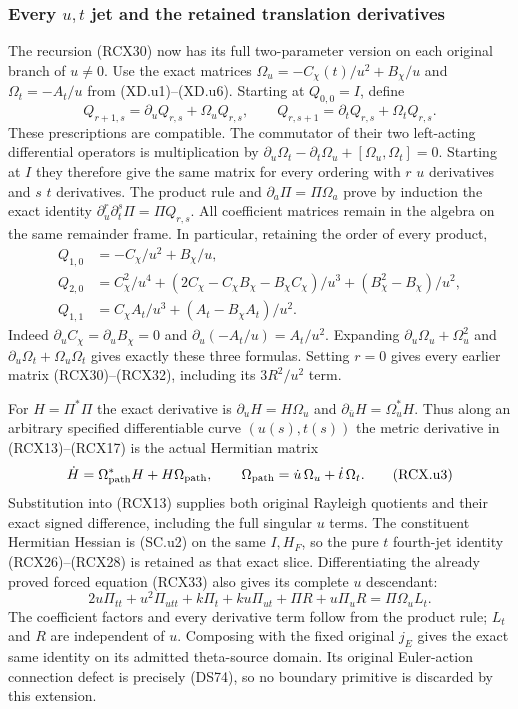 
\subsubsection{Every $u,t$ jet and the retained translation derivatives}
The recursion (RCX30) now has its full two-parameter version on
each original branch of $u\ne0$.  Use the exact matrices
$\Omega_u=-C_\chi(t)/u^2+B_\chi/u$ and
$\Omega_t=-A_t/u$ from (XD.u1)--(XD.u6).  Starting at
$Q_{0,0}=I$, define
\[
 Q_{r+1,s}=\partial_uQ_{r,s}+\Omega_uQ_{r,s},\qquad
 Q_{r,s+1}=\partial_tQ_{r,s}+\Omega_tQ_{r,s}.          \tag{RCX.u1}
\]
These prescriptions are compatible.  The commutator of their
two left-acting differential operators is multiplication by
$\partial_u\Omega_t-\partial_t\Omega_u+
[\Omega_u,\Omega_t]=0$.  Starting at $I$ they therefore give
the same matrix for every ordering with $r$ $u$ derivatives
and $s$ $t$ derivatives.  The product rule and
$\partial_a\Pi=\Pi\Omega_a$ prove by induction the exact
identity
$\partial_u^r\partial_t^s\Pi=\Pi Q_{r,s}$.
All coefficient matrices remain in the algebra on the same
remainder frame.  In particular, retaining the order of
every product,
\[
 \begin{split}
 Q_{1,0}&=-C_\chi/u^2+B_\chi/u,\\
 Q_{2,0}&=C_\chi^2/u^4+
       (2C_\chi-C_\chi B_\chi-B_\chi C_\chi)/u^3
                         +(B_\chi^2-B_\chi)/u^2,\\
 Q_{1,1}&=C_\chi A_t/u^3+(A_t-B_\chi A_t)/u^2.
 \end{split}                                      \tag{RCX.u2}
\]
Indeed $\partial_uC_\chi=\partial_uB_\chi=0$ and
$\partial_u(-A_t/u)=A_t/u^2$.  Expanding
$\partial_u\Omega_u+\Omega_u^2$ and
$\partial_u\Omega_t+\Omega_u\Omega_t$ gives exactly
these three formulas.  Setting $r=0$ gives every earlier
matrix (RCX30)--(RCX32), including its $3R^2/u^2$ term.

For $H=\Pi^*\Pi$ the exact derivative is
$\partial_uH=H\Omega_u$ and
$\partial_{\bar u}H=\Omega_u^*H$.  Thus along an arbitrary
specified differentiable curve $(u(s),t(s))$ the metric
derivative in (RCX13)--(RCX17) is the actual Hermitian matrix
\[
 \dot H=\Omega_{\rm path}^*H+H\Omega_{\rm path},
 \qquad\Omega_{\rm path}=\dot u\,\Omega_u+\dot t\,\Omega_t.
 \tag{RCX.u3}
\]
Substitution into (RCX13) supplies both original Rayleigh
quotients and their exact signed difference, including the
full singular $u$ terms.  The constituent Hermitian Hessian
is (SC.u2) on the same $I,H_F$, so the pure $t$ fourth-jet
identity (RCX26)--(RCX28) is retained as that exact slice.
Differentiating the already proved forced equation (RCX33)
also gives its complete $u$ descendant:
\[
 2u\Pi_{tt}+u^2\Pi_{utt}+k\Pi_t+ku\Pi_{ut}
       +\Pi R+u\Pi_uR=\Pi\Omega_u L_t.             \tag{RCX.u4}
\]
The coefficient factors and every derivative term follow from
the product rule; $L_t$ and $R$ are independent of $u$.
Composing with the fixed original $j_E$ gives the exact same
identity on its admitted theta-source domain.  Its original
Euler-action connection defect is precisely (DS74), so no
boundary primitive is discarded by this extension.


